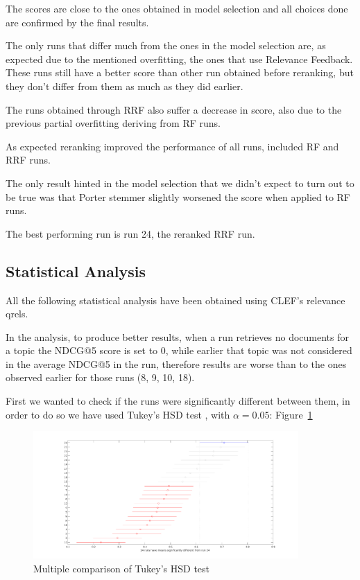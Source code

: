 The scores are close to the ones obtained in model selection and all choices done are confirmed by the final results.

The only runs that differ much from the ones in the model selection are, as expected due to the mentioned overfitting, the ones that use Relevance Feedback.
These runs still have a better score than other run obtained before reranking, but they don't differ from them as much as they did earlier.

The runs obtained through RRF also suffer a decrease in score, also due to the previous partial overfitting deriving from RF runs.

As expected reranking improved the performance of all runs, included RF and RRF runs.

The only result hinted in the model selection that we didn't expect to turn out to be true was that Porter stemmer slightly worsened the score when applied to RF runs.

The best performing run is run 24, the reranked RRF run.

\subsection{Statistical Analysis}

All the following statistical analysis have been obtained using CLEF's relevance qrels.

In the analysis, to produce better results, when a run retrieves no documents for a topic the NDCG@5 score is set to 0, while earlier that topic was not considered in the average NDCG@5 in the run, therefore results are worse than to the ones observed earlier for those runs (8, 9, 10, 18).

First we wanted to check if the runs were significantly different between them, in order to do so we have used Tukey's HSD test \citep{Tukey}, with $\alpha=0.05$: Figure~\ref{fig:multcomp}

\begin{figure}[h]
	\centering
	\includegraphics[width=0.9\textwidth]{figure/Multcomp.pdf}
	\caption{Multiple comparison of Tukey's HSD test}
	\label{fig:multcomp}
\end{figure}

